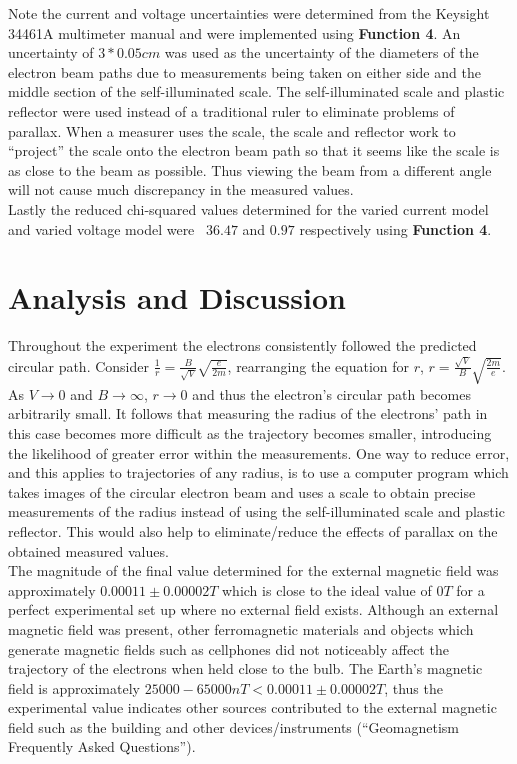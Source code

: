 \documentclass[
	letterpaper, %
	10pt, %
]{CSUniSchoolLabReport}
\begin{document}
Note the current and voltage uncertainties were determined from the Keysight 34461A multimeter manual
and were implemented using \textbf{Function 4}. An uncertainty of  $3 * 0.05 cm$ was used as the
uncertainty of the diameters of the electron beam paths due to measurements being taken on
either side and the middle section of the self-illuminated scale. The self-illuminated
scale and plastic reflector were used instead of a traditional ruler to eliminate problems of
parallax. When a measurer uses the scale, the scale and reflector work to “project” the scale
onto the electron beam path so that it seems like the scale is as close to the beam as possible.
Thus viewing the beam from a different angle will not cause much discrepancy in the measured values.\\

Lastly the reduced chi-squared values determined for the varied current model and varied voltage model were \
$36.47$ and $0.97$ respectively using \textbf{Function 4}.

\section{Analysis and Discussion}
Throughout the experiment the electrons consistently followed the predicted circular path. Consider
$\frac 1r = \frac B {\sqrt V} \sqrt{\frac{e}{2m}}$, rearranging the equation for $r$,
$r = \frac{\sqrt V}{B}\sqrt{\frac{2m}{e}}$. As $V\rightarrow 0$ and $B\rightarrow \infty$,
$r\rightarrow 0$ and thus the electron's circular path becomes arbitrarily small. It follows
that measuring the radius of the electrons' path in this case becomes more difficult as the
trajectory becomes smaller, introducing the likelihood of greater error within the measurements.
One way to reduce error, and this applies to trajectories of any radius, is to use a computer
program which takes images of the circular electron beam and uses a scale to obtain precise
measurements of the radius instead of using the self-illuminated scale and plastic reflector.
This would also help to eliminate/reduce the effects of parallax on the obtained measured values.\\

The magnitude of the final value determined for the external magnetic field was approximately
$0.00011 \pm 0.00002 T$ which is close to the ideal value of $0 T$ for a perfect experimental
set up where no external field exists. Although an external magnetic field was present, other
ferromagnetic materials and objects which generate magnetic fields such as cellphones did not
noticeably affect the trajectory of the electrons when held close to the bulb. The Earth’s magnetic
field is approximately $25000-65000 nT < 0.00011 \pm 0.00002 T$, thus the experimental value
indicates other sources contributed to the external magnetic field such as the building and other
devices/instruments (“Geomagnetism Frequently Asked Questions”).\\
\end{document}
